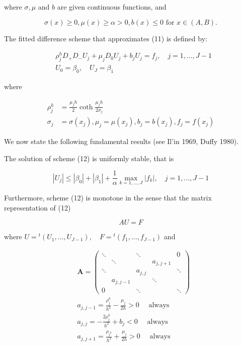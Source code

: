 \documentclass[10pt]{article}
\begin{document}
where $\sigma, \mu$ and $b$ are given continuous functions, and

$$
\sigma(x) \geq 0, \mu(x) \geq \alpha>0, b(x) \leq 0 \text { for } x \in(A, B) .
$$

The fitted difference scheme that approximates (11) is defined by:


\begin{align*}
& \rho_{j}^{h} D_{+} D_{-} U_{j}+\mu_{j} D_{0} U_{j}+b_{j} U_{j}=f_{j}, \quad j=1, \ldots, J-1  \tag{12}\\
& U_{0}=\beta_{0}, \quad U_{J}=\beta_{1}
\end{align*}


where


\begin{align*}
\rho_{j}^{h} & =\frac{\mu_{j} h}{2} \operatorname{coth} \frac{\mu_{j} h}{2 \sigma_{j}}  \tag{13}\\
\sigma_{j} & =\sigma\left(x_{j}\right), \mu_{j}=\mu\left(x_{j}\right), b_{j}=b\left(x_{j}\right), f_{j}=f\left(x_{j}\right)
\end{align*}


We now state the following fundamental results (see Il'in 1969, Duffy 1980).

The solution of scheme (12) is uniformly stable, that is

$$
\left|U_{j}\right| \leq\left|\beta_{0}\right|+\left|\beta_{1}\right|+\frac{1}{\alpha} \max _{k=1, \ldots, J}\left|f_{k}\right|, \quad j=1, \ldots, J-1
$$

Furthermore, scheme (12) is monotone in the sense that the matrix representation of (12)

$$
A U=F
$$

where $U={ }^{t}\left(U_{1}, \ldots, U_{J-1}\right), \quad F={ }^{t}\left(f_{1}, \ldots, f_{J-1}\right)$ and


\begin{align*}
& \mathbf{A}=\left(\begin{array}{ccccc}
\ddots & & \ddots & & 0 \\
& \ddots & & a_{j, j+1} & \\
\ddots & & a_{j, j} & & \ddots \\
& a_{j, j-1} & & \ddots & \\
0 & & \ddots & & \ddots
\end{array}\right)  \tag{14}\\
& a_{j, j-1}=\frac{\rho_{j}^{h}}{h^{2}}-\frac{\mu_{j}}{2 h}>0 \quad \text { always } \\
& a_{j, j}=-\frac{2 \rho_{j}^{h}}{h^{2}}+b_{j}<0 \quad \text { always } \\
& a_{j, j+1}=\frac{\rho_{j^{h}}}{h^{2}}+\frac{\mu_{j}}{2 h}>0 \quad \text { always }
\end{align*}
\end{document}

